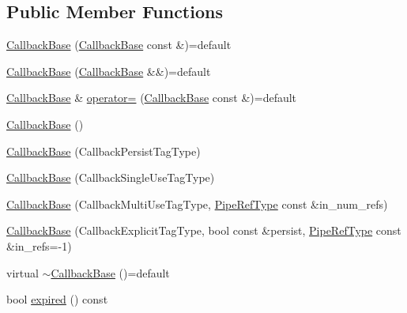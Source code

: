 \subsection*{Public Member Functions}
\begin{DoxyCompactItemize}
\item 
\hyperlink{structvt_1_1pipe_1_1callback_1_1_callback_base_aed02135f19f5d5ca4899d488ce402b64}{Callback\+Base} (\hyperlink{structvt_1_1pipe_1_1callback_1_1_callback_base}{Callback\+Base} const \&)=default
\item 
\hyperlink{structvt_1_1pipe_1_1callback_1_1_callback_base_aa90843711601bd1174ba64f69f754eb8}{Callback\+Base} (\hyperlink{structvt_1_1pipe_1_1callback_1_1_callback_base}{Callback\+Base} \&\&)=default
\item 
\hyperlink{structvt_1_1pipe_1_1callback_1_1_callback_base}{Callback\+Base} \& \hyperlink{structvt_1_1pipe_1_1callback_1_1_callback_base_a078375aa25cb0c0e2968804ef3a86a5f}{operator=} (\hyperlink{structvt_1_1pipe_1_1callback_1_1_callback_base}{Callback\+Base} const \&)=default
\item 
\hyperlink{structvt_1_1pipe_1_1callback_1_1_callback_base_a683cee48109181768cd44354bc98e3e1}{Callback\+Base} ()
\item 
\hyperlink{structvt_1_1pipe_1_1callback_1_1_callback_base_ae96d1355aa94b4fd32469bbb9280717c}{Callback\+Base} (Callback\+Persist\+Tag\+Type)
\item 
\hyperlink{structvt_1_1pipe_1_1callback_1_1_callback_base_a18840ed75fb94811cb34c17da8703588}{Callback\+Base} (Callback\+Single\+Use\+Tag\+Type)
\item 
\hyperlink{structvt_1_1pipe_1_1callback_1_1_callback_base_a2abdcbd2debf98179075077783a1b725}{Callback\+Base} (Callback\+Multi\+Use\+Tag\+Type, \hyperlink{namespacevt_ace18d74dd489d9ea506d38789fffce34}{Pipe\+Ref\+Type} const \&in\+\_\+num\+\_\+refs)
\item 
\hyperlink{structvt_1_1pipe_1_1callback_1_1_callback_base_aed70ff142d52c21d9f18e52eb6a6e38b}{Callback\+Base} (Callback\+Explicit\+Tag\+Type, bool const \&persist, \hyperlink{namespacevt_ace18d74dd489d9ea506d38789fffce34}{Pipe\+Ref\+Type} const \&in\+\_\+refs=-\/1)
\item 
virtual \hyperlink{structvt_1_1pipe_1_1callback_1_1_callback_base_adc39148be97af3105f9b5765431bdc9a}{$\sim$\+Callback\+Base} ()=default
\item 
bool \hyperlink{structvt_1_1pipe_1_1callback_1_1_callback_base_a9ef1595197b291a660e6d19aadb0203e}{expired} () const
\item 

\end{DoxyCompactItemize}
